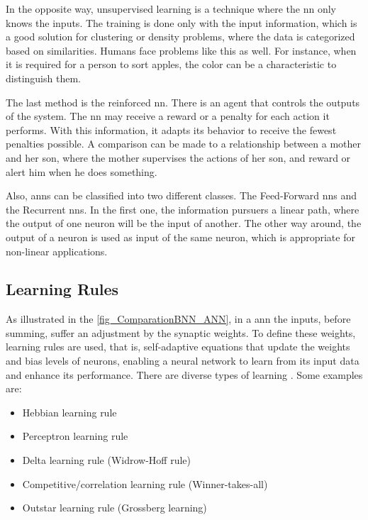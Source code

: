 In the opposite way, unsupervised learning is a technique where the \gls{nn} only knows the inputs. The training is done only with the input 
information, which is a good solution for clustering or density problems, where the data is categorized based on similarities. Humans face 
problems like this as well. For instance, when it is required for a person to sort apples, the color can be a characteristic to distinguish them. 

The last method is the reinforced \gls{nn}. There is an agent that controls the outputs of the system. The \gls{nn} may receive a reward or a 
penalty for each action it performs. With this information, it adapts its behavior to receive the fewest penalties possible. A comparison can 
be made to a relationship between a mother and her son, where the mother supervises the actions of her son, and reward or alert him when he 
does something.

Also, \glspl{ann} can be classified into two different classes. The Feed-Forward \glspl{nn} and the Recurrent \glspl{nn}. In the first one, 
the information pursuers a linear path, where the output of one neuron will be the input of another. The other way around, the output of a 
neuron is used as input of the same neuron, which is appropriate for non-linear applications. 

\subsection{Learning Rules}

As illustrated in the \autoref{fig_ComparationBNN_ANN}, in a \gls{ann} the inputs, before summing, suffer an adjustment by the synaptic weights. 
To define these weights, learning rules are used, that is, self-adaptive equations that update the weights and bias levels of neurons, enabling 
a neural network to learn from its input data and enhance its performance. There are diverse types of learning \cite{haykin2009neural}. Some 
examples are:

\begin{itemize}
    \item Hebbian learning rule
    \item Perceptron learning rule
    \item Delta learning rule (Widrow-Hoff rule)
    \item Competitive/correlation learning rule (Winner-takes-all)
    \item Outstar learning rule (Grossberg learning)
\end{itemize}

